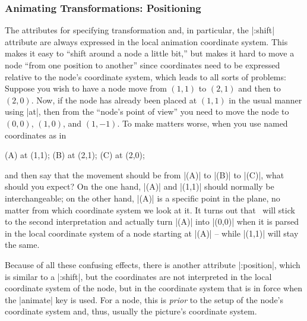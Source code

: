 \subsubsection{Animating Transformations: Positioning}

The attributes for specifying transformation and, in particular, the
|:shift| attribute are always expressed in the local animation
coordinate system. This makes it easy to ``shift around a node a
little bit,'' but makes it hard to move a node ``from one position to
another'' since coordinates need to be expressed relative to the node's
coordinate system, which leads to all sorts of problems: Suppose you
wish to have a node move from $(1,1)$ to $(2,1)$ and then to
$(2,0)$. Now, if the node has already been placed at $(1,1)$ in the
usual manner using |at|, then from the ``node's point of view'' you
need to move the node to $(0,0)$, $(1,0)$, and $(1,-1)$. To make
matters worse, when you use named coordinates as in
\begin{codeexample}
\coordinate(A) at (1,1);
\coordinate(B) at (2,1);
\coordinate(C) at (2,0);
\end{codeexample}
and then say that the movement should be from |(A)| to |(B)| to |(C)|,
what should you expect? On the one hand, |(A)| and |(1,1)| should
normally be interchangeable; on the other hand, |(A)| is a specific
point in the plane, no matter from which coordinate system we look at
it. It turns out that \tikzname\ will stick to the second
interpretation and actually turn |(A)| into |(0,0)| when it is parsed
in the local coordinate system of a node starting at |(A)| -- while
|(1,1)| will stay the same.

Because of all these confusing effects, there is another attribute
|:position|, which is similar to a |:shift|, but the coordinates are
not interpreted in the local coordinate system of the node, but in the
coordinate system that is in force when the |animate| key is used. For
a node, this is \emph{prior} to the setup of the node's coordinate
system and, thus, usually the picture's coordinate system.  

